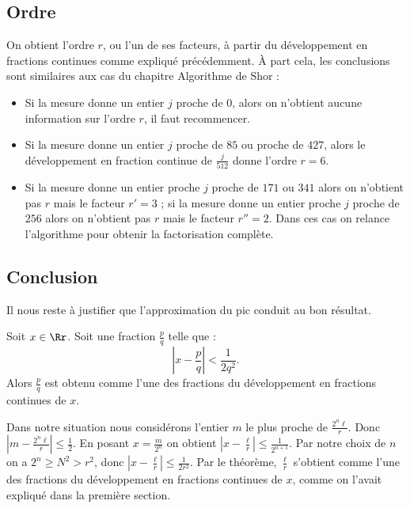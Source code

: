 \documentclass[11pt,class=report,crop=false]{standalone}
\begin{document}
 

\subsection{Ordre}

On obtient l'ordre $r$, ou l'un de ses facteurs, à partir du développement en fractions continues comme expliqué précédemment. \`A part cela, les conclusions sont similaires aux cas du chapitre \og{}Algorithme de Shor\fg{} :

\begin{itemize}
  \item Si la mesure donne un entier $j$ proche de $0$, alors on n'obtient aucune information sur l'ordre $r$, il faut recommencer.
  \item Si la mesure donne un entier $j$ proche de $85$ ou proche de $427$, alors le développement en fraction continue de $\frac{j}{512}$ donne l'ordre $r=6$.
  \item Si la mesure donne un entier proche $j$ proche de $171$ ou $341$ alors on n'obtient pas $r$ mais le facteur $r'=3$ ; si la mesure donne un entier proche $j$ proche de $256$ alors on n'obtient pas $r$ mais le facteur $r''=2$. Dans ces cas on relance l'algorithme pour obtenir la factorisation complète.
\end{itemize}


\subsection{Conclusion}

Il nous reste à justifier que l'approximation du pic conduit au bon résultat.

\begin{theoreme}
Soit $x \in \Rr$. Soit une fraction $\frac{p}{q}$ telle que :
$$\left| x - \frac{p}{q} \right| < \frac{1}{2q^2}.$$
Alors $\frac{p}{q}$ est obtenu comme l'une des fractions du développement en fractions continues de $x$.
\end{theoreme}

Dans notre situation nous considérons l'entier $m$ le plus proche de $\frac{2^n\ell}{r}$. Donc $\left|m- \frac{2^n\ell}{r}\right| \le \frac12$.
En posant $x = \frac{m}{2^n}$ on obtient $\left|x- \frac{\ell}{r}\right| \le \frac1{2^{n+1}}$.
Par notre choix de $n$ on a $2^n \ge N^2 > r^2$, donc $\left|x- \frac{\ell}{r}\right| \le \frac1{2r^2}$. Par le théorème, $\frac{\ell}{r}$ s'obtient comme l'une des fractions du développement en fractions continues de $x$, comme on l'avait expliqué dans la première section.
\end{document}
